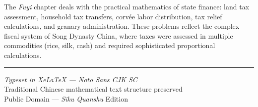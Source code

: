 \documentclass[10pt,a4paper]{article}
\begin{document}
The \textit{Fuyi} chapter deals with the practical mathematics of state finance: land tax assessment, household tax transfers, corv\'{e}e labor distribution, tax relief calculations, and granary administration. These problems reflect the complex fiscal system of Song Dynasty China, where taxes were assessed in multiple commodities (rice, silk, cash) and required sophisticated proportional calculations.

\vspace{1.5cm}
\begin{center}
\textcolor{rulecolor}{\rule{0.5\textwidth}{0.4pt}}

\vspace{1em}
{\small\color{sectioncolor}
\textit{Typeset in XeLaTeX --- Noto Sans CJK SC}\\
Traditional Chinese mathematical text structure preserved\\
Public Domain --- \textit{Siku Quanshu} Edition}
\end{center}
\end{document}
